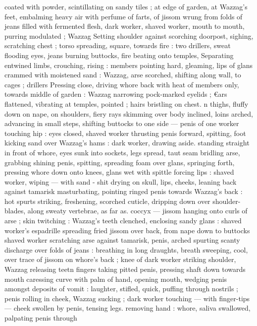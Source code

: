 coated with powder, scintillating on sandy tiles ; at edge of garden, 
at Wazzag's feet, embalming heavy air with perfume of farts, of 
jissom wrung from folds of jeans filled with fermented flesh, dark 
worker, shaved worker, mouth to mouth, purring modulated ; Wazzag 
Setting shoulder against scorching doorpost, sighing, scratching 
chest ; torso spreading, square, towards fire : two drillers, sweat 
flooding eyes, jeans burning buttocks, fire beating onto temples, 
Separating entwined limbs, crouching, rising : members pointing 
hard, gleaming, lips of glans crammed with moistened sand : 
Wazzag, arse scorched, shifting along wall, to cages ; drillers 
Pressing close, driving whore back with heat of members only, 
towards middle of garden : Wazzag narrowing pock-marked eyelids ; 
€ars flattened, vibrating at temples, pointed ; hairs bristling on chest. 
n thighs, fluffy down on nape, on shoulders, fiery rays skimming 
over body inclined, loins arched, advancing in small steps, shifting 
buttocks to one side --- penis of one worker touching hip : eyes 
closed, shaved worker thrusting penis forward, spitting, foot kicking 
sand over Wazzag's hams : dark worker, drawing aside. standing 
straight in front of whore, eyes sunk into sockets, legs spread, taut 
seam bridling arse, grabbing shining penis, spitting, spreading foam 
over glans, springing forth, pressing whore down onto knees, glans 
wet with spittle forcing lips : shaved worker, wiping --- with sand - 
shit drying on skull, lips, cheeks, leaning back against tamarisk 
masturbating, pointing ringed penis towards Wazzag's back : hot 
spurts striking, freshening, scorched cuticle, dripping down over 
shoulder-blades, along sweaty vertebrae, as far as. coccyx --- jissom 
hanging onto curls of arse ; skin twitching : Wazzag's teeth 
clenched, enclosing sandy glans : shaved worker's espadrille 
spreading fried jissom over back, from nape down to buttocks 
shaved worker scratching arse against tamarisk, penis, arched 
spurting scanty discharge over folds of jeans : breathing in long 
draughts, breath sweeping, cool, over trace of jissom on whore's 
back ; knee of dark worker striking shoulder, Wazzag releasing teetn 
fingers taking pitted penis, pressing shaft down towards mouth 
caressing curve with palm of hand, opening mouth, wedging penis 
amongst deposits of vomit : laughter, stifled, quick, puffing through 
nostrils ; penis rolling in cheek, Wazzag sucking ; dark worker 
touching --- with finger-tips --- cheek swollen by penis, tensing legs. 
removing hand : whore, saliva swallowed, palpating penis through 
